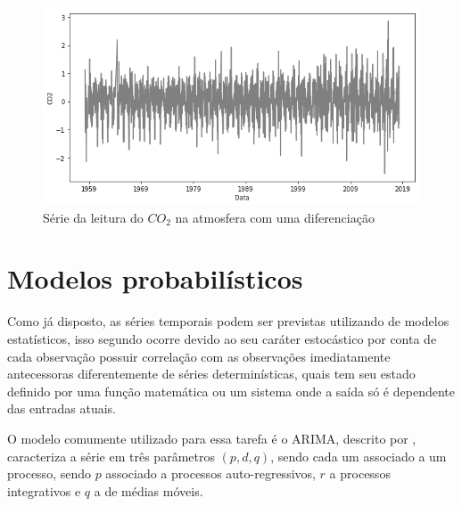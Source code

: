 \documentclass[
    12pt,
    oneside,
    a4paper,
    english,
    brazil
]{abntex2}
\begin{document}

\begin{figure}
    \centering
    \caption{Série da leitura do $CO_2$ na atmosfera com uma
        diferenciação}\label{fig:co2diff}
    \includegraphics[width=.6\linewidth]{images/co2_diff.png}
\end{figure}



\section{Modelos probabilísticos}

Como já disposto, as séries temporais podem ser previstas utilizando de modelos
estatísticos, isso segundo  ocorre devido ao seu caráter
estocástico por conta de cada observação possuir correlação com as observações
imediatamente antecessoras diferentemente de séries determinísticas, quais tem
seu estado definido por uma função matemática ou um sistema onde a saída só é
dependente das entradas atuais.

O modelo comumente utilizado para essa tarefa é o ARIMA, descrito por
, caracteriza a série em três parâmetros $(p,d,q)$, sendo cada
um associado a um processo, sendo $p$ associado a processos auto-regressivos,
$r$ a processos integrativos e $q$ a de médias móveis.
\end{document}
